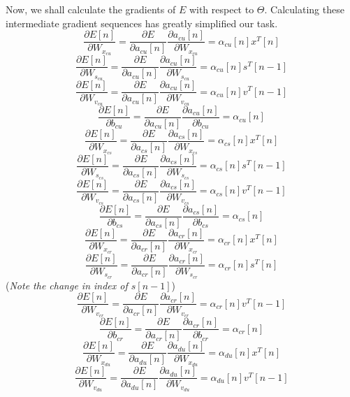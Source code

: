 \documentclass[12pt,letterpaper]{article}
\begin{document}
Now, we shall calculate the gradients of $E$ with respect to $\Theta$. 
Calculating these intermediate gradient sequences has greatly simplified our task.
\[ 
\frac{\partial{E[n]}}{\partial{W_{x_{cu}}}} = \frac{\partial{E}}{\partial{a_{cu}[n]}}\frac{\partial{a_{cu}[n]}}{\partial{W_{x_{cu}}}} = \alpha_{cu}[n]x^{T}[n] \tag{64}
\]
\[ 
\frac{\partial{E[n]}}{\partial{W_{s_{cu}}}} = \frac{\partial{E}}{\partial{a_{cu}[n]}}\frac{\partial{a_{cu}[n]}}{\partial{W_{s_{cu}}}} = \alpha_{cu}[n]s^{T}[n-1] \tag{65}
\]
\[ 
\frac{\partial{E[n]}}{\partial{W_{v_{cu}}}} = \frac{\partial{E}}{\partial{a_{cu}[n]}}\frac{\partial{a_{cu}[n]}}{\partial{W_{v_{cu}}}} = \alpha_{cu}[n]v^{T}[n-1] \tag{66}
\]
\[ 
\frac{\partial{E[n]}}{\partial{b_{cu}}} = \frac{\partial{E}}{\partial{a_{cu}[n]}}\frac{\partial{a_{cu}[n]}}{\partial{b_{cu}}} = \alpha_{cu}[n] \tag{67}
\]
\[ 
\frac{\partial{E[n]}}{\partial{W_{x_{cs}}}} = \frac{\partial{E}}{\partial{a_{cs}[n]}}\frac{\partial{a_{cs}[n]}}{\partial{W_{x_{cs}}}} = \alpha_{cs}[n]x^{T}[n] \tag{68}
\]
\[ 
\frac{\partial{E[n]}}{\partial{W_{s_{cs}}}} = \frac{\partial{E}}{\partial{a_{cs}[n]}}\frac{\partial{a_{cs}[n]}}{\partial{W_{s_{cs}}}} = \alpha_{cs}[n]s^{T}[n-1] \tag{69}
\]
\[ 
\frac{\partial{E[n]}}{\partial{W_{v_{cs}}}} = \frac{\partial{E}}{\partial{a_{cs}[n]}}\frac{\partial{a_{cs}[n]}}{\partial{W_{v_{cs}}}} = \alpha_{cs}[n]v^{T}[n-1] \tag{70}
\]
\[ 
\frac{\partial{E[n]}}{\partial{b_{cs}}} = \frac{\partial{E}}{\partial{a_{cs}[n]}}\frac{\partial{a_{cs}[n]}}{\partial{b_{cs}}} = \alpha_{cs}[n] \tag{71}
\]
\[ 
\frac{\partial{E[n]}}{\partial{W_{x_{cr}}}} = \frac{\partial{E}}{\partial{a_{cr}[n]}}\frac{\partial{a_{cr}[n]}}{\partial{W_{x_{cr}}}} = \alpha_{cr}[n]x^{T}[n] \tag{72}
\]
\[ 
\frac{\partial{E[n]}}{\partial{W_{s_{cr}}}} = \frac{\partial{E}}{\partial{a_{cr}[n]}}\frac{\partial{a_{cr}[n]}}{\partial{W_{s_{cr}}}} = \alpha_{cr}[n]s^{T}[n] \tag{73}
\]
(\textit{Note the change in index of $s[n-1]$})
\[ 
\frac{\partial{E[n]}}{\partial{W_{v_{cr}}}} = \frac{\partial{E}}{\partial{a_{cr}[n]}}\frac{\partial{a_{cr}[n]}}{\partial{W_{v_{cr}}}} = \alpha_{cr}[n]v^{T}[n-1] \tag{74}
\]
\[ 
\frac{\partial{E[n]}}{\partial{b_{cr}}} = \frac{\partial{E}}{\partial{a_{cr}[n]}}\frac{\partial{a_{cr}[n]}}{\partial{b_{cr}}} = \alpha_{cr}[n] \tag{75}
\]
\[ 
\frac{\partial{E[n]}}{\partial{W_{x_{du}}}} = \frac{\partial{E}}{\partial{a_{du}[n]}}\frac{\partial{a_{du}[n]}}{\partial{W_{x_{du}}}} = \alpha_{du}[n]x^{T}[n] \tag{76}
\]
\[ 
\frac{\partial{E[n]}}{\partial{W_{v_{du}}}} = \frac{\partial{E}}{\partial{a_{du}[n]}}\frac{\partial{a_{du}[n]}}{\partial{W_{v_{du}}}} = \alpha_{du}[n]v^{T}[n-1] \tag{77}
\]
\end{document}

